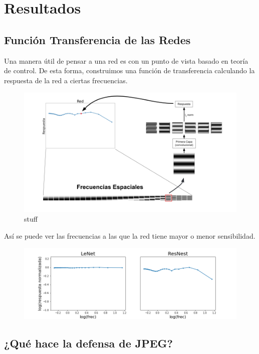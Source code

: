 \section{Resultados}
\subsection{Función Transferencia de las Redes}
Una manera útil de pensar a una red es con un punto de vista basado en teoría de control. De esta forma, construimos una función de transferencia calculando la respuesta de la red a ciertas frecuencias. 
\begin{figure}[h!]
    \centering
    \includegraphics[width=\textwidth]{images/bode_diagrams/explanation_bode.png}
    \caption{stuff}
    \label{bode_explain}
\end{figure}

Así se puede ver las frecuencias a las que la red tiene mayor o menor sensibilidad.

\begin{figure}[h!]
    \centering
    \includegraphics[width=\textwidth]{images/bode_diagrams/mnist_nets.png}
    \caption{}
    \label{bode_examples}
\end{figure}
\subsection{¿Qué hace la defensa de JPEG?}

